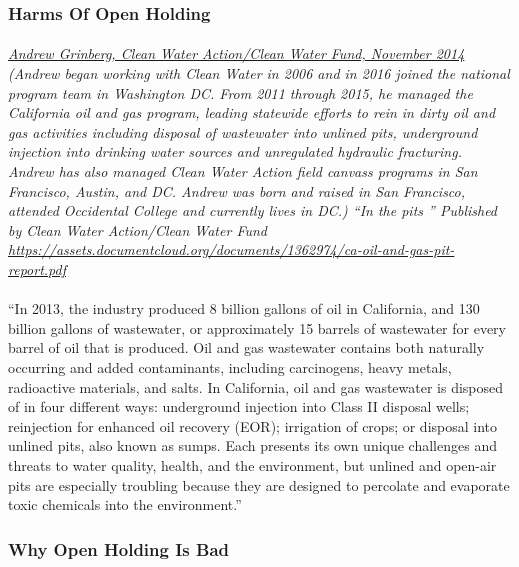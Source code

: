 \documentclass{article}
\begin{document}
\subsubsection{Harms Of Open Holding}
\paragraph{}
\small
\textit{  
\underline{Andrew Grinberg, Clean Water Action/Clean Water Fund, November 2014}
  (Andrew began working with Clean Water in 2006 and in 2016 joined the national program team in Washington DC. From 2011 through 2015, he managed the California oil and gas program, leading statewide efforts to rein in dirty oil and gas activities including disposal of wastewater into unlined pits, underground injection into drinking water sources and unregulated hydraulic fracturing. Andrew has also managed Clean Water Action field canvass programs in San Francisco, Austin, and DC. Andrew was born and raised in San Francisco, attended Occidental College and currently lives in DC.) “In the pits ” Published by Clean Water Action/Clean Water Fund 
\url{https://assets.documentcloud.org/documents/1362974/ca-oil-and-gas-pit-report.pdf} }
\normalsize
\paragraph{}
``In 2013, the industry produced 8 billion gallons of oil in California, and 130 billion gallons of wastewater, or approximately 15 barrels of wastewater for every barrel of oil that is produced. Oil and gas wastewater contains both naturally occurring and added contaminants, including carcinogens, heavy metals, radioactive materials, and salts. In California, oil and gas wastewater is disposed of in four different ways: underground injection into Class II disposal wells; reinjection for enhanced oil recovery (EOR); irrigation of crops; or disposal into unlined pits, also known as sumps. Each presents its own unique challenges and threats to water quality, health, and the environment, but unlined and open-air pits are especially troubling because they are designed to percolate and evaporate toxic chemicals into the environment.''

\subsubsection{Why Open Holding Is Bad}
\end{document}

